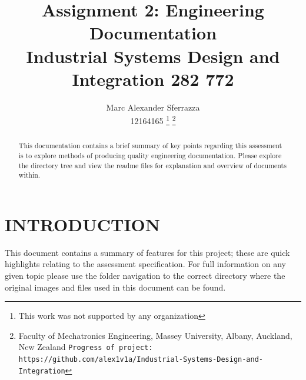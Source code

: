 \documentclass[a4paper, 10pt]{IEEEconf}
\title{\LARGE \bf Assignment 2: Engineering Documentation\\Industrial Systems Design and Integration 282 772}
\author{Marc Alexander Sferrazza \\ 12164165
\thanks{This work was not supported by any organization}
\thanks{Faculty of Mechatronics Engineering, Massey University, Albany, Auckland, New Zealand
        {\tt\small Progress of project: https://github.com/alex1v1a/Industrial-Systems-Design-and-Integration} } }
\begin{document}
\maketitle
\thispagestyle{empty}
\pagestyle{plain}



\begin{abstract}

This documentation contains a brief summary of key points regarding this assessment is to explore methods of producing quality engineering documentation. Please explore the directory tree and view the readme files for explanation and overview of documents within.

\end{abstract}


\clearpage
\thispagestyle{empty}
\tableofcontents
\begingroup
\let\clearpage\relax
\listoffigures
\endgroup
\clearpage
\twocolumn

\clearpage
\setcounter{page}{1}
\onecolumn

\section{INTRODUCTION}
This document contains a summary of features for this project; these are quick highlights relating to the assessment specification. For full information on any given topic please use the folder navigation to the correct directory where the original images and files used in this document can be found.
\end{document}
